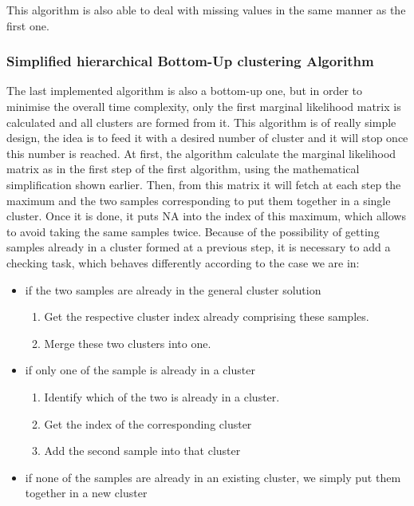 \documentclass[twocolumn]{article}
\begin{document}
This algorithm is also able to deal with missing values in the same manner as the first one.

\subsubsection{Simplified hierarchical Bottom-Up clustering Algorithm}

The last implemented algorithm is also a bottom-up one, but in order to minimise the overall time complexity, only the first marginal likelihood matrix is calculated and all clusters are formed from it.
This algorithm is of really simple design, the idea is to feed it with a desired number of cluster and it will stop once this number is reached.
At first, the algorithm calculate the marginal likelihood matrix as in the first step of the first algorithm, using the mathematical simplification shown earlier.
Then, from this matrix it will fetch at each step the maximum and the two samples corresponding to put them together in a single cluster. Once it is done, it puts NA into the index of this maximum, which allows to avoid taking the same samples twice.
Because of the possibility of getting samples already in a cluster formed at a previous step, it is necessary to add a checking task, which behaves differently according to the case we are in:
\begin{itemize}
    \item if the two samples are already in the general cluster solution
        \begin{enumerate}
            \item Get the respective cluster index already comprising these samples.
            \item Merge these two clusters into one.
        \end{enumerate}
    \item if only one of the sample is already in a cluster
        \begin{enumerate}
            \item Identify which of the two is already in a cluster.
            \item Get the index of the corresponding cluster
            \item Add the second sample into that cluster
        \end{enumerate}
    \item if none of the samples are already in an existing cluster, we simply put them together in a new cluster
\end{itemize}
\end{document}
